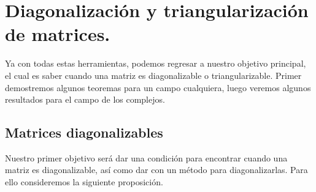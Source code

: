 \section{Diagonalización y triangularización de matrices.}

Ya con todas estas herramientas, podemos regresar a nuestro objetivo principal, el cual es saber cuando una matriz es diagonalizable o triangularizable. Primer demostremos algunos teoremas para un campo cualquiera, luego veremos algunos resultados para el campo de los complejos.

\subsection{Matrices diagonalizables}

Nuestro primer objetivo será dar una condición para encontrar cuando una matriz es diagonalizable, así como dar con un método para diagonalizarlas. Para ello consideremos la siguiente proposición.

